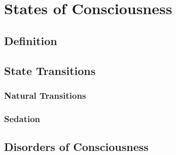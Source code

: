 
\section{States of Consciousness}\label{sec:states-of-consciousness}

\subsection{Definition}\label{subsec:definition}
\qquad {}
\subsection{State Transitions}\label{subsec:state-transitions}

\subsubsection{Natural Transitions}
    \qquad \qquad {}
\subsubsection{Sedation}
    \qquad \qquad {}
\subsection{Disorders of Consciousness}\label{subsec:disorders-of-consciousness}
\qquad {}


